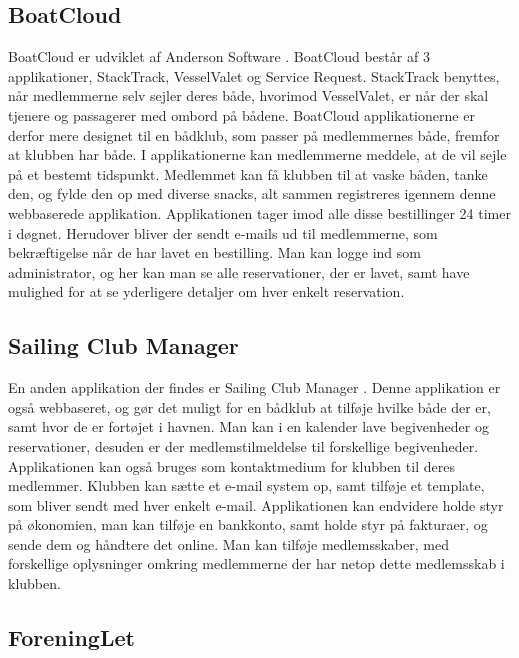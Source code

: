 \subsection*{BoatCloud}

BoatCloud er udviklet af Anderson Software \citep{BoatCloud}.
BoatCloud består af 3 applikationer, StackTrack, VesselValet og Service Request. 
StackTrack benyttes, når medlemmerne selv sejler deres både, hvorimod VesselValet, er når der skal tjenere og passagerer med ombord på bådene. 
BoatCloud applikationerne er derfor mere designet til en bådklub, som passer på medlemmernes både, fremfor at klubben har både. 
I applikationerne kan medlemmerne meddele, at de vil sejle på et bestemt tidspunkt. 
Medlemmet kan få klubben til at vaske båden, tanke den, og fylde den op med diverse snacks, alt sammen registreres igennem denne webbaserede applikation. 
Applikationen tager imod alle disse bestillinger 24 timer i døgnet. 
Herudover bliver der sendt e-mails ud til medlemmerne, som bekræftigelse når de har lavet en bestilling. 
Man kan logge ind som administrator, og her kan man se alle reservationer, der er lavet, samt have mulighed for at se yderligere detaljer om hver enkelt reservation.


\subsection*{Sailing Club Manager}

En anden applikation der findes er Sailing Club Manager \citep{SailClub}. 
Denne applikation er også webbaseret, og gør det muligt for en bådklub at tilføje hvilke både der er, samt hvor de er fortøjet i havnen. 
Man kan i en kalender lave begivenheder og reservationer, desuden er der medlemstilmeldelse til forskellige begivenheder. Applikationen kan også bruges som kontaktmedium for klubben til deres medlemmer. 
Klubben kan sætte et e-mail system op, samt tilføje et template, som bliver sendt med hver enkelt e-mail.
Applikationen kan endvidere holde styr på økonomien, man kan tilføje en bankkonto, samt  holde styr på fakturaer, og sende dem og håndtere det online. 
Man kan tilføje medlemsskaber, med forskellige oplysninger omkring medlemmerne der har netop dette medlemsskab i klubben.

\subsection*{ForeningLet}

